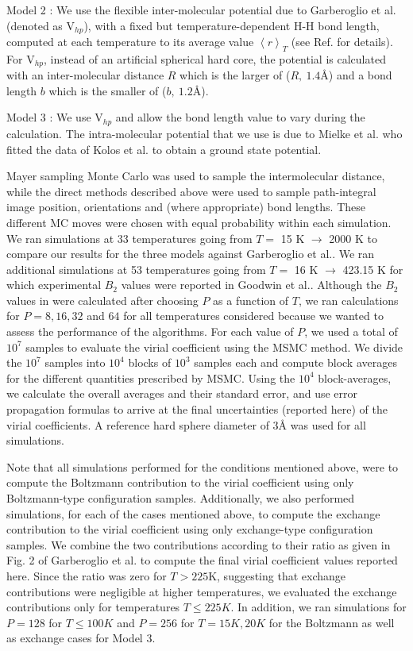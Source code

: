         Model 2 : We use the flexible inter-molecular potential due to Garberoglio et al.\cite{Garberoglio2012} (denoted as V$_{hp}$), with a fixed but temperature-dependent H-H bond length, computed at each temperature to its average value $\left< r \right>_T$ (see Ref. \cite{Garberoglio2012} for details). For V$_{hp}$, instead of an artificial spherical hard core, the potential is calculated with an inter-molecular distance $R$ which is the larger of ($R,\: 1.4${\AA}) and a bond length $b$ which is the smaller of ($b,\: 1.2${\AA}).

        Model 3 : We use V$_{hp}$ and allow the bond length value to vary during the calculation. The intra-molecular potential that we use is due to Mielke et al.\cite{Mielke2002} who fitted the data of Kolos et al.\cite{Kolos1986} to obtain a ground state potential.

        Mayer sampling Monte Carlo was used to sample the intermolecular distance, while the direct methods described above were used to sample path-integral image position, orientations and (where appropriate) bond lengths. These different MC moves were chosen with equal probability within each simulation. We ran simulations at 33 temperatures going from $T =$ 15 K $\to$ 2000 K to compare our results for the three models against Garberoglio et al.\cite{Garberoglio2014}. We ran additional simulations at 53 temperatures going from $T =$ 16 K $\to$ 423.15 K for which experimental $B_2$ values were reported in Goodwin et al.\cite{Goodwin1963}. Although the $B_2$ values in \cite{Garberoglio2014} were calculated after choosing $P$ as a function of $T$, we ran calculations for $P = 8, 16, 32$ and $64$ for all temperatures considered because we wanted to assess the performance of the algorithms. For each value of $P$, we used a total of $10^7$ samples to evaluate the virial coefficient using the MSMC\cite{Singh2004} method. We divide the $10^7$ samples into $10^4$ blocks of $10^3$ samples each and compute block averages for the different quantities prescribed by MSMC. Using the $10^4$ block-averages, we calculate the overall averages and their standard error, and use error propagation formulas to arrive at the final uncertainties (reported here) of the virial coefficients. A reference hard sphere diameter of 3{\AA} was used for all simulations.

        Note that all simulations performed for the conditions mentioned above, were to compute the Boltzmann contribution to the virial coefficient using only Boltzmann-type configuration samples. Additionally, we also performed simulations, for each of the cases mentioned above, to compute the exchange contribution to the virial coefficient using only exchange-type configuration samples. We combine the two contributions according to their ratio as given in Fig. 2 of Garberoglio et al. \cite{Garberoglio2014} to compute the final virial coefficient values reported here. Since the ratio was zero for $T > 225$K, suggesting that exchange contributions were negligible at higher temperatures, we evaluated the exchange contributions only for temperatures $T \le 225K$. In addition, we ran simulations for $P = 128$ for $T \le 100K$ and $P = 256$ for $T = 15K, 20K$ for the Boltzmann as well as exchange cases for Model 3.

